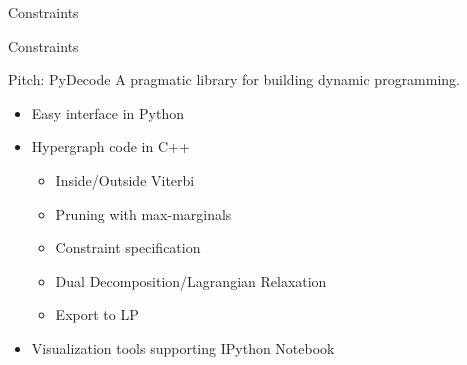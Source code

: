 \documentclass{beamer}
\def\im#1#2{
  \node(#1) [scale=#2]{\pgfbox[center,top]{\pgfuseimage{#1}}
};}
\begin{document}
\begin{frame}{Constraints}
  \vspace{-3cm}
  \begin{figure}
    \centering
  \end{figure}
\end{frame}

\begin{frame}{Constraints}
  \vspace{-3cm}

  \begin{figure}
    \centering
  \end{figure}
\end{frame}

\begin{frame}{}
  
\end{frame}

\begin{frame}{Pitch: PyDecode}
  A pragmatic library for building dynamic programming. 

  \begin{itemize}
  \item Easy interface in Python
  \item Hypergraph code in C++
    \begin{itemize}
    \item Inside/Outside Viterbi
    \item Pruning with max-marginals
    \item Constraint specification 
    \item Dual Decomposition/Lagrangian Relaxation 
    \item Export to LP
    \end{itemize}
  \item Visualization tools supporting IPython Notebook
  \end{itemize}
\end{frame}
\end{document}
